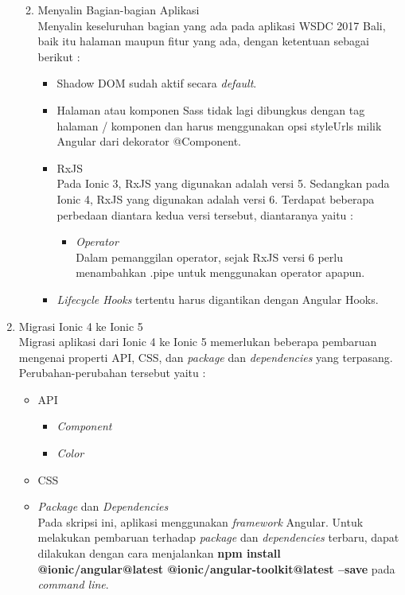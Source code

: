 \begin{enumerate}
\begin{enumerate}
\begin{itemize}
		\end{itemize}
		\newpage
		\item Menyalin Bagian-bagian Aplikasi \\
		Menyalin keseluruhan bagian yang ada pada aplikasi WSDC 2017 Bali, baik itu halaman maupun fitur yang ada, dengan ketentuan sebagai berikut :
		\begin{itemize}
			\item Shadow DOM sudah aktif secara {\it default}.
			\item Halaman atau komponen Sass tidak lagi dibungkus dengan tag halaman / komponen dan harus menggunakan opsi styleUrls milik Angular dari dekorator @Component.
			\item RxJS \\
			Pada Ionic 3, RxJS yang digunakan adalah versi 5. Sedangkan pada Ionic 4, RxJS yang digunakan adalah versi 6. Terdapat beberapa perbedaan diantara kedua versi tersebut, diantaranya yaitu :
			\begin{itemize}
				\item {\it Operator} \\
				Dalam pemanggilan operator, sejak RxJS versi 6 perlu menambahkan .pipe untuk menggunakan operator apapun.
			\end{itemize}
			\item {\it Lifecycle Hooks} tertentu harus digantikan dengan Angular Hooks.
		\end{itemize}
	\end{enumerate}
	\item Migrasi Ionic 4 ke Ionic 5 \\
	Migrasi aplikasi dari Ionic 4 ke Ionic 5 memerlukan beberapa pembaruan mengenai properti API, CSS, dan {\it package} dan {\it dependencies} yang terpasang. Perubahan-perubahan tersebut yaitu :
	\begin{itemize}
		\item API
		\begin{itemize}
			\item {\it Component}
			\item {\it Color}
			
		\end{itemize}
		\item CSS \\
		
		\item {\it Package} dan {\it Dependencies} \\
		Pada skripsi ini, aplikasi menggunakan {\it framework} Angular. Untuk melakukan pembaruan terhadap {\it package} dan {\it dependencies} terbaru, dapat dilakukan dengan cara menjalankan \textbf{npm install @ionic/angular@latest @ionic/angular-toolkit@latest --save} pada {\it command line}.
	\end{itemize}
\end{enumerate}


